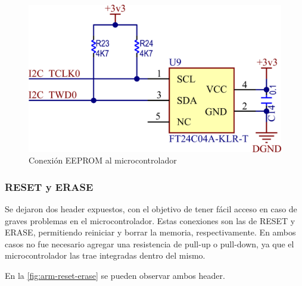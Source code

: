 \documentclass[../et.tex]{subfiles}
\begin{document}
\begin{figure}[!htbp]
  \centering
  \includegraphics[scale=1.5]{../images/arm-eeprom.png}
  \caption{Conexión EEPROM al microcontrolador}
  \label{fig:arm-eeprom}
\end{figure}

\subsubsection{RESET y ERASE}
Se dejaron dos header expuestos, con el objetivo de tener fácil acceso en caso de graves problemas en el microcontrolador. Estas conexiones son las de RESET y ERASE, permitiendo reiniciar y borrar la memoria, respectivamente. En ambos casos no fue necesario agregar una resistencia de pull-up o pull-down, ya que el microcontrolador las trae integradas dentro del mismo.

En la \autoref{fig:arm-reset-erase} se pueden observar ambos header.
\end{document}
